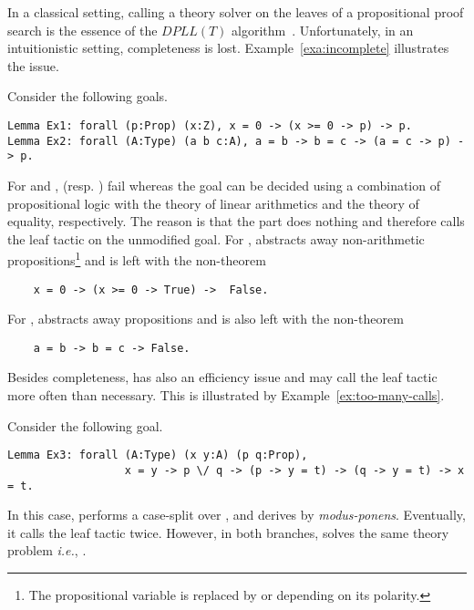 \documentclass[utf8,a4paper,UKenglish,cleveref, autoref, thm-restate]{lipics-v2019}
\begin{document}
In a classical setting, calling a theory solver on the leaves of a
propositional proof search is the essence of the $\mathit{DPLL(T)}$
algorithm~\cite{GanzingerHNOT04}.  Unfortunately, in an intuitionistic
setting, completeness is lost. Example~\ref{exa:incomplete}
illustrates the issue.
\begin{example}
  \label{exa:incomplete}
  Consider the following goals.
  \begin{verbatim}
Lemma Ex1: forall (p:Prop) (x:Z), x = 0 -> (x >= 0 -> p) -> p.
Lemma Ex2: forall (A:Type) (a b c:A), a = b -> b = c -> (a = c -> p) -> p.
\end{verbatim}
  For  and ,  (resp. ) fail whereas
  the goal can be decided using a combination of
  propositional logic with the theory of linear arithmetics and
  the theory of equality, respectively.
  The reason is that the  part does nothing and
  therefore calls the leaf tactic on the unmodified goal.  For
  ,  abstracts away non-arithmetic
  propositions\footnote{The propositional variable  is replaced by
     or  depending on its polarity.} and is
  left with the non-theorem
  \begin{verbatim}
    x = 0 -> (x >= 0 -> True) ->  False.
  \end{verbatim}
  For ,  abstracts away
  propositions and is also left with the non-theorem
  \begin{verbatim}
    a = b -> b = c -> False.
  \end{verbatim}
\end{example}
Besides completeness,  has also an efficiency issue and may call the leaf tactic 
more often than necessary. %
This is illustrated by Example~\ref{ex:too-many-calls}.
\begin{example}
  \label{ex:too-many-calls}
  Consider the following goal.
  \begin{verbatim}
Lemma Ex3: forall (A:Type) (x y:A) (p q:Prop),
                  x = y -> p \/ q -> (p -> y = t) -> (q -> y = t) -> x = t.
  \end{verbatim}
  In this case,  performs a case-split
  over , and derives  by
  \emph{modus-ponens}. Eventually, it calls the leaf tactic
   twice.  However, in both branches,
   solves the same theory problem \emph{i.e.},
  .
\end{example}
\end{document}
